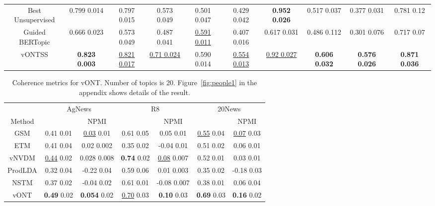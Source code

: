 \documentclass[11pt]{article}
\begin{document}
\begin{table*}
{\begin{tabular}{| c| c c c| c c c| c c c |}
\multicolumn{1}{c}{Best Unsupervised} \vline & 0.799  0.014 & 0.797  0.015 & 0.573 0.049  & 0.501  0.047  & 0.429  0.042 & \textbf{0.952  0.026} & 0.517  0.037   & 0.377  0.031 & 0.781  0.12\\

\multicolumn{1}{c}{Guided BERTopic} \vline & 0.666  0.023  & 0.573 0.049 & 0.487  0.041   & \underline{0.591  0.011}  & 0.407  0.016 & 0.617  0.031 & 0.486  0.112   & 0.301  0.076 & 0.717  0.07\\

\hline
\multicolumn{1}{c}{vONTSS} \vline  & \textbf{0.823  0.003} & \underline{0.821  0.017} & \underline{0.71  0.024}  & 0.590  0.014 & \underline{0.554  0.013} & \underline{0.92  0.027} & \textbf{0.606  0.032} & \textbf{0.576  0.026} & \textbf{0.871  0.036} \\
\hline

\end{tabular}}


\end{table*}

\begin{table*}[ ]
\centering
\caption{Coherence metrics for vONT. Number of topics is 20. Figure~\ref{fig:people1} in the appendix shows details of the result.}
\vskip 0.15in
\scalebox{0.9} {
\centering
\begin{tabular}{| c| c c| c c| c c } 
\hline
\multicolumn{1}{c}{} \vline &
\multicolumn{2}{c}{AgNews}\vline  & \multicolumn{2}{c}{R8} \vline & \multicolumn{2}{c}{20News}\vline\\
\multicolumn{1}{c}{Method} \vline &
 \multicolumn{1}{c}{} & \multicolumn{1}{c}{NPMI} \vline
& \multicolumn{1}{c}{} & \multicolumn{1}{c}{NPMI} \vline
& \multicolumn{1}{c}{} & \multicolumn{1}{c}{NPMI}\vline \\
\hline
\multicolumn{1}{c}{GSM} \vline & 0.41  0.01 & \underline{0.03}  0.01 & 0.61  0.05 & 0.05  0.01  &  \underline{0.55}  0.04 & \underline{0.07}  0.03\\
\multicolumn{1}{c}{ETM} \vline & 0.41  0.04 & 0.02  0.002    & 0.35  0.02 & -0.04  0.01  & 0.51  0.02 & 0.06  0.01\\
\multicolumn{1}{c}{vNVDM} \vline  & \underline{0.44}  0.02 & 0.028  0.008   & \textbf{0.74}  0.02 & \underline{0.08}  0.007 & 0.52  0.01 & 0.03  0.01\\
\multicolumn{1}{c}{ProdLDA} \vline  & 0.32  0.04 & -0.22  0.04   &  0.59  0.06 & 0.01  0.003 &  0.35  0.02 & -0.18  0.03\\
\multicolumn{1}{c}{NSTM} \vline &  0.37  0.02  & -0.04  0.02   & 0.61  0.01 & -0.08  0.007 &  0.38  0.01 & 0.06  0.04\\
\hline
\multicolumn{1}{c}{vONT} \vline &  \textbf{0.49}  0.02 & \textbf{0.054}  0.02   &  \underline{0.70}  0.03 & \textbf{0.10}  0.03 &  \textbf{0.69}  0.03 & \textbf{0.16}  0.02\\
\hline
\end{tabular}}

\label{table:2}
\end{table*}
\end{document}
